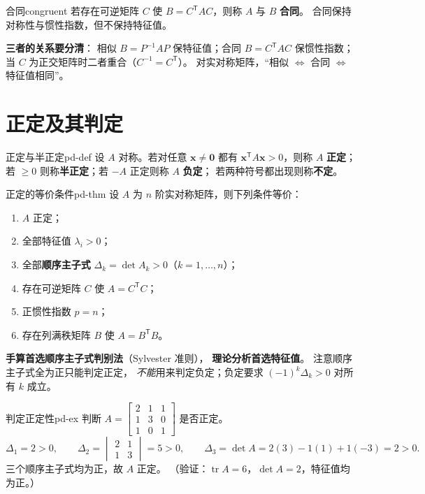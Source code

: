 \documentclass[11pt,a4paper,openany]{ctexbook}
\DeclareMathOperator{\tr}{tr}
\begin{document}
\begin{defn}{合同}{congruent}
若存在可逆矩阵 $C$ 使 $B=C^{\mathsf T}AC$，则称 $A$ 与 $B$ \textbf{合同}。
合同保持对称性与惯性指数，但不保持特征值。
\end{defn}

\begin{keypoint}
\textbf{三者的关系要分清}：
相似 $B=P^{-1}AP$ 保特征值；合同 $B=C^{\mathsf T}AC$ 保惯性指数；
当 $C$ 为正交矩阵时二者重合（$C^{-1}=C^{\mathsf T}$）。
对实对称矩阵，“相似 $\Leftrightarrow$ 合同 $\Leftrightarrow$ 特征值相同”。
\end{keypoint}

\section{正定及其判定}

\begin{defn}{正定与半正定}{pd-def}
设 $A$ 对称。若对任意 $\boldsymbol{x}\neq\boldsymbol{0}$ 都有
$\boldsymbol{x}^{\mathsf T}A\boldsymbol{x}>0$，则称 $A$ \textbf{正定}；
若 $\ge 0$ 则称\textbf{半正定}；若 $-\!A$ 正定则称 $A$ \textbf{负定}；
若两种符号都出现则称\textbf{不定}。
\end{defn}

\begin{thm}{正定的等价条件}{pd-thm}
设 $A$ 为 $n$ 阶实对称矩阵，则下列条件等价：
\begin{enumerate}[label=(\alph*), itemsep=1pt]
\item $A$ 正定；
\item 全部特征值 $\lambda_i>0$；
\item 全部\textbf{顺序主子式} $\Delta_k=\det A_k>0$（$k=1,\dots,n$）；
\item 存在可逆矩阵 $C$ 使 $A=C^{\mathsf T}C$；
\item 正惯性指数 $p=n$；
\item 存在列满秩矩阵 $B$ 使 $A=B^{\mathsf T}B$。
\end{enumerate}
\end{thm}

\begin{keypoint}
\textbf{手算首选顺序主子式判别法}（Sylvester 准则），
\textbf{理论分析首选特征值}。
注意顺序主子式全为正只能判定正定，
\emph{不能}用来判定负定；负定要求 $(-1)^k\Delta_k>0$ 对所有 $k$ 成立。
\end{keypoint}

\begin{exmp}{判定正定性}{pd-ex}
判断 $A=\begin{bmatrix}2&1&1\\1&3&0\\1&0&1\end{bmatrix}$ 是否正定。
\[
\Delta_1=2>0,\qquad
\Delta_2=\begin{vmatrix}2&1\\1&3\end{vmatrix}=5>0,\qquad
\Delta_3=\det A=2(3)-1(1)+1(-3)=2>0.
\]
三个顺序主子式均为正，故 $A$ 正定。
（验证：$\tr A=6$，$\det A=2$，特征值均为正。）
\end{exmp}
\end{document}
